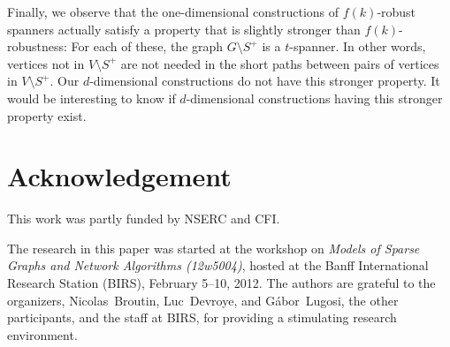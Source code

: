 \documentclass{patmorin}
\begin{document}
Finally, we observe that the one-dimensional constructions of
$f(k)$-robust spanners actually satisfy a property that is slightly
stronger than $f(k)$-robustness:  For each of these, the graph $G\setminus
S^+$ is a $t$-spanner.  In other words, vertices not in $V\setminus
S^+$ are not needed in the short paths between pairs of vertices in
$V\setminus S^+$.  Our $d$-dimensional constructions do not have this
stronger property.  It would be interesting to know if $d$-dimensional
constructions having this stronger property exist.

\section*{Acknowledgement}

This work was partly funded by NSERC and CFI.

The research in this paper was started at the workshop on \emph{Models
of Sparse Graphs and Network Algorithms (12w5004)}, hosted at the
Banff International Research Station (BIRS), February 5--10, 2012.
The authors are grateful to the organizers, \mbox{Nicolas~Broutin},
\mbox{Luc~Devroye}, and \mbox{G\'abor~Lugosi}, the other participants, and the staff
at BIRS, for providing a stimulating research environment.



\end{document}
